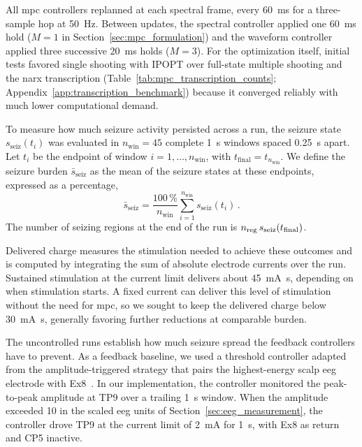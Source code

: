 All \ac{mpc} controllers replanned at each spectral frame, every \SI{60}{\milli\second} for a three-sample hop at \SI{50}{\hertz}.
Between updates, the spectral controller applied one \SI{60}{\milli\second} hold ($M=1$ in Section~\ref{sec:mpc_formulation}) and the waveform controller applied three successive \SI{20}{\milli\second} holds ($M=3$).
For the optimization itself, initial tests favored single shooting with IPOPT over full-state multiple shooting and the \ac{narx} transcription (Table~\ref{tab:mpc_transcription_counts}; Appendix~\ref{app:transcription_benchmark}) because it converged reliably with much lower computational demand.

To measure how much seizure activity persisted across a run, the seizure state $s_{\mathrm{seiz}}(t_i)$ was evaluated in \mbox{$n_{\mathrm{win}}=45$} complete \SI{1}{\second} windows spaced \SI{0.25}{\second} apart.
Let $t_i$ be the endpoint of window \mbox{$i=1,\ldots,n_{\mathrm{win}}$}, with \mbox{$t_{\mathrm{final}}=t_{n_{\mathrm{win}}}$}.
We define the seizure burden $\bar{s}_{\mathrm{seiz}}$ as the mean of the seizure states at these endpoints, expressed as a percentage,
\begin{equation*}
  \bar{s}_{\mathrm{seiz}} = \frac{100\,\%}{n_{\mathrm{win}}}\sum_{i=1}^{n_{\mathrm{win}}} s_{\mathrm{seiz}}(t_i)\,.
\end{equation*}
The number of seizing regions at the end of the run is $n_{\mathrm{reg}}\,s_{\mathrm{seiz}}(t_{\mathrm{final}})$.

Delivered charge measures the stimulation needed to achieve these outcomes and is computed by integrating the sum of absolute electrode currents over the run.
Sustained stimulation at the current limit delivers about \SI{45}{\milli\ampere\second}, depending on when stimulation starts.
A fixed current can deliver this level of stimulation without the need for \ac{mpc}, so we sought to keep the delivered charge below \SI{30}{\milli\ampere\second}, generally favoring further reductions at comparable burden.

The uncontrolled runs establish how much seizure spread the feedback controllers have to prevent.
As a feedback baseline, we used a threshold controller adapted from the amplitude-triggered strategy that pairs the highest-energy scalp \ac{eeg} electrode with Ex8~\cite{Yu2024}.
In our implementation, the controller monitored the peak-to-peak amplitude at TP9 over a trailing \SI{1}{\second} window.
When the amplitude exceeded 10 in the scaled \ac{eeg} units of Section~\ref{sec:eeg_measurement}, the controller drove TP9 at the current limit of \SI{2}{\milli\ampere} for \SI{1}{\second}, with Ex8 as return and CP5 inactive.

